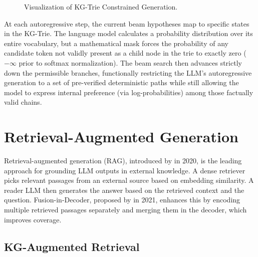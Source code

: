 \begin{figure}[H]
{
  }
  \caption[Visualization of KG-Trie Constrained Generation]{Visualization of KG-Trie Constrained Generation.}
  \label{fig:kg_trie_search}
\end{figure}

At each autoregressive step, the current beam hypotheses map to specific states in the KG-Trie. The language model calculates a probability distribution over its entire vocabulary, but a mathematical mask forces the probability of any candidate token not validly present as a child node in the trie to exactly zero ($-\infty$ prior to softmax normalization). The beam search then advances strictly down the permissible branches, functionally restricting the LLM's autoregressive generation to a set of pre-verified deterministic paths while still allowing the model to express internal preference (via log-probabilities) among those factually valid chains.



\section{Retrieval-Augmented Generation}
\label{sec:rag}

Retrieval-augmented generation (RAG), introduced by \citet{lewis2020rag} in 2020, is the leading approach for grounding LLM outputs in external knowledge. A dense retriever picks relevant passages from an external source based on embedding similarity. A reader LLM then generates the answer based on the retrieved context and the question. Fusion-in-Decoder, proposed by \citet{izacard2021leveraging} in 2021, enhances this by encoding multiple retrieved passages separately and merging them in the decoder, which improves coverage.

\subsection{KG-Augmented Retrieval}

